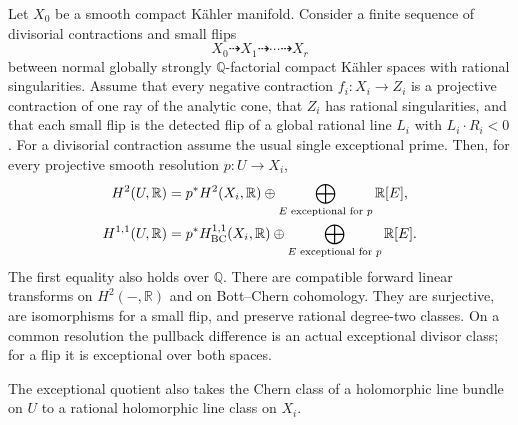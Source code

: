 \begin{lemma}
\label{prog:detected-cohomology}
Let $X_0$ be a smooth compact K\"ahler manifold. Consider a finite
sequence of divisorial contractions and small flips
\[
                         X_0\dashrightarrow X_1\dashrightarrow\cdots
                         \dashrightarrow X_r
\]
between normal globally strongly $\mathbb Q$-factorial compact
K\"ahler spaces with rational singularities.
Assume that every negative contraction $f_i:X_i\to Z_i$ is a
projective contraction of one ray of the analytic cone, that $Z_i$
has rational singularities, and that each small flip is the detected
flip of a global rational line $L_i$ with $L_i\cdot R_i<0$.
For a divisorial contraction assume the usual single exceptional
prime. Then, for every projective smooth resolution $p:U\to X_i$,
\begin{align*}
 H^2(U,\mathbb R)
   &=p^*H^2(X_i,\mathbb R)
       \oplus\bigoplus_{E\text{ exceptional for }p}\mathbb R[E],\\
 H^{1,1}(U,\mathbb R)
   &=p^*H^{1,1}_{\rm BC}(X_i,\mathbb R)
       \oplus\bigoplus_{E\text{ exceptional for }p}\mathbb R[E].
\end{align*}
The first equality also holds over $\mathbb Q$. There are compatible
forward linear transforms on $H^2(-,\mathbb R)$ and on Bott--Chern
cohomology. They are surjective, are isomorphisms for a small flip,
and preserve rational degree-two classes. On a common resolution the
pullback difference is an actual exceptional divisor class; for a
flip it is exceptional over both spaces.

The exceptional quotient also takes the Chern class of a holomorphic
line bundle on $U$ to a rational holomorphic line class on $X_i$.
\end{lemma}

